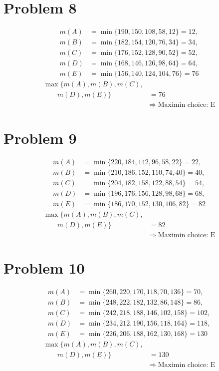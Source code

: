 \section{Problem 8}
\[
	\begin{aligned}
	m(A) &= \min\{190,150,108,58,12\}=12,\\
	m(B) &= \min\{182,154,120,76,34\}=34,\\
	m(C) &= \min\{176,152,128,90,52\}=52,\\
	m(D) &= \min\{168,146,126,98,64\}=64,\\
	m(E) &= \min\{156,140,124,104,76\}=76
	\end{aligned}
	\]
	\[
	\begin{aligned}
	\max\{m(A),m(B),m(C),\\
	\qquad m(D),m(E)\} &= 76\\
	&\Rightarrow\;\text{Maximin choice: E}
	\end{aligned}
	\]

\section{Problem 9}
\[
	\begin{aligned}
	m(A) &= \min\{220,184,142,96,58,22\}=22,\\
	m(B) &= \min\{210,186,152,110,74,40\}=40,\\
	m(C) &= \min\{204,182,158,122,88,54\}=54,\\
	m(D) &= \min\{196,176,156,128,98,68\}=68,\\
	m(E) &= \min\{186,170,152,130,106,82\}=82
	\end{aligned}
	\]
	\[
	\begin{aligned}
	\max\{m(A),m(B),m(C),\\
	\qquad m(D),m(E)\} &= 82\\
	&\Rightarrow\;\text{Maximin choice: E}
	\end{aligned}
	\]

\section{Problem 10}
\[
	\begin{aligned}
	m(A) &= \min\{260,220,170,118,70,136\}=70,\\
	m(B) &= \min\{248,222,182,132,86,148\}=86,\\
	m(C) &= \min\{242,218,188,146,102,158\}=102,\\
	m(D) &= \min\{234,212,190,156,118,164\}=118,\\
	m(E) &= \min\{226,206,188,162,130,168\}=130
	\end{aligned}
	\]
	\[
	\begin{aligned}
	\max\{m(A),m(B),m(C),\\
	\qquad m(D),m(E)\} &= 130\\
	&\Rightarrow\;\text{Maximin choice: E}
	\end{aligned}
	\]




